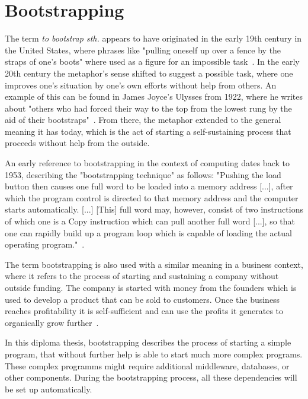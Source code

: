 \section{Bootstrapping}
\label{fundamentals:bootstrapping}

The term \textit{to bootstrap sth.} appears to have originated in the early 19th century in the United States, where phrases like "pulling oneself up over a fence by the straps of one's boots" where used as a figure for an impossible task~\autocite{bootstrap:history}.
In the early 20th century the metaphor's sense shifted to suggest a possible task, where one improves one's situation by one's own efforts without help from others.
An example of this can be found in James Joyce's Ulysses from 1922, where he writes about "others who had forced their way to the top from the lowest rung by the aid of their bootstraps"~\autocite{bootstrap:ulysses}.
From there, the metaphor extended to the general meaning it has today, which is the act of starting a self-sustaining process that proceeds without help from the outside.

An early reference to bootstrapping in the context of computing dates back to 1953, describing the "bootstrapping technique" as follows: "Pushing the load button then causes one full word to be loaded into a memory address [...], after which the program control is directed to that memory address and the computer starts automatically. [...] [This] full word may, however, consist of two instructions of which one is a Copy instruction which can pull another full word [...], so that one can rapidly build up a program loop which is capable of loading the actual operating program."~\autocite[p.~1273]{bootstrap:early}.

The term bootstrapping is also used with a similar meaning in a business context, where it refers to the process of starting and sustaining a company without outside funding.
The company is started with money from the founders which is used to develop a product that can be sold to customers.
Once the business reaches profitability it is self-sufficient and can use the profits it generates to organically grow further~\autocite{bootstrap:business}.

In this diploma thesis, bootstrapping describes the process of starting a simple program, that without further help is able to start much more complex programs.
These complex programms might require additional middleware, databases, or other components.
During the bootstrapping process, all these dependencies will be set up automatically.
